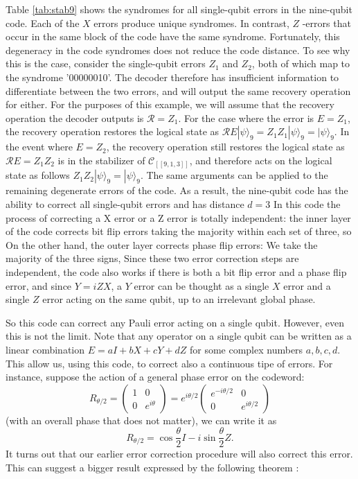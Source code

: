 Table \ref{tab:stab9} shows the syndromes for all single-qubit errors in the nine-qubit code. Each of the $X$ errors produce unique syndromes. In contrast, $Z$ -errors that occur in the same block of the code have the same syndrome. Fortunately, this degeneracy in the code syndromes does not reduce the code distance. To see why this is the case, consider the single-qubit errors $Z_{1}$ and $Z_{2}$, both of which map to the syndrome '00000010'. The decoder therefore has insufficient information to differentiate between the two errors, and will output the same recovery operation for either. For the purposes of this example, we will assume that the recovery operation the decoder outputs is $\mathcal{R}=Z_{1}$. For the case where the error is $E=Z_{1}$, the recovery operation restores the logical state as $\mathcal{R} E|\psi\rangle_{9}=Z_{1} Z_{1}|\psi\rangle_{9}=|\psi\rangle_{9} .$ In the event where $E=Z_{2}$, the recovery operation still restores the logical state as $\mathcal{R} E=Z_{1} Z_{2}$ is in the stabilizer of $\mathcal{C}_{[[9,1,3]]}$, and therefore acts on the logical state as follows $Z_{1} Z_{2}|\psi\rangle_{9}=|\psi\rangle_{9} .$ The same arguments can be applied to the remaining degenerate errors of the code. As a result, the nine-qubit code has the ability to correct all single-qubit errors and has distance $d=3$
In this code the process of correcting a X error or a Z error is totally independent: 
the inner layer of the code corrects bit flip errors taking the majority within each set of three, so 
On the other hand, the outer layer corrects phase flip errors: We take the majority of the three signs,
Since these two error correction steps are independent, the code also works if there is both a bit flip error and a phase flip error, and since $Y = iZX$, a $Y$ error can be thought as a single $X$ error and a single $Z$ error acting on the same qubit, up to an irrelevant global phase.

So this code can correct any Pauli error acting on a single qubit. However, even this is not the limit. Note that any operator on a single qubit can be written as a linear combination $E= aI + bX + cY+dZ$ for some complex numbers $a,b,c,d$. This allow us, using this code, to correct also a continuous tipe of errors. For instance, suppose the action of a general phase error on the codeword: 
$$
R_{\theta / 2}=\left(\begin{array}{cc}
1 & 0 \\
0 & e^{i \theta}
\end{array}\right)=e^{i \theta / 2}\left(\begin{array}{cc}
e^{-i \theta / 2} & 0 \\
0 & e^{i \theta / 2}
\end{array}\right)
$$
(with an overall phase that does not matter), we can write it as
$$
R_{\theta / 2}=\cos \frac{\theta}{2} I-i \sin \frac{\theta}{2} Z .
$$
It turns out that our earlier error correction procedure will also correct this error.
This can suggest a bigger result expressed by the following theorem \cite{DanielGottesman}:

